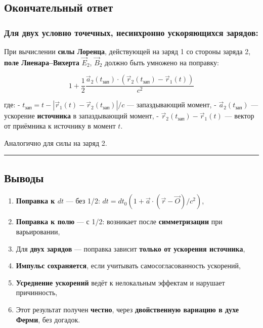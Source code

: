 \documentclass[11pt]{article}
\providecommand{\tightlist}{%
      \setlength{\itemsep}{0pt}\setlength{\parskip}{0pt}}
\begin{document}
\subsection{Окончательный ответ}

\subsubsection{Для двух условно точечных, несинхронно ускоряющихся зарядов:}

При вычислении \textbf{силы Лоренца}, действующей на заряд 1 со стороны
заряда 2, \textbf{поле Лиенара--Вихерта} \(\vec{E}_2\), \(\vec{B}_2\)
должно быть умножено на поправку:

\[
\boxed{
1 + \frac{1}{2} \frac{\vec{a}_2(t_{\text{зап}}) \cdot (\vec{r}_2(t_{\text{зап}}) - \vec{r}_1(t))}{c^2}
}
\]

где: -
\(t_{\text{зап}} = t - |\vec{r}_1(t) - \vec{r}_2(t_{\text{зап}})|/c\)
--- запаздывающий момент, - \(\vec{a}_2(t_{\text{зап}})\) --- ускорение
\textbf{источника} в запаздывающий момент, -
\(\vec{r}_2(t_{\text{зап}}) - \vec{r}_1(t)\) --- вектор от приёмника к
источнику в момент \(t\).

Аналогично для силы на заряд 2.

\begin{center}\rule{0.5\linewidth}{\linethickness}\end{center}

\subsection{ Выводы}

\begin{enumerate}
\def\labelenumi{\arabic{enumi}.}
\tightlist
\item
   \textbf{Поправка к \(dt\)} --- без 1/2:
  \(dt = dt_0 (1 + \vec{a} \cdot (\vec{r} - \vec{O})/c^2)\),
\item
   \textbf{Поправка к полю} --- с 1/2: возникает после
  \textbf{симметризации} при варьировании,
\item
   Для \textbf{двух зарядов} --- поправка зависит \textbf{только от
  ускорения источника},
\item
   \textbf{Импульс сохраняется}, если учитывать самосогласованность
  ускорений,
\item
   \textbf{Усреднение ускорений} ведёт к нелокальным эффектам и
  нарушает причинность,
\item
   Этот результат получен \textbf{честно}, через \textbf{двойственную
  вариацию в духе Ферми}, без догадок.
\end{enumerate}
\end{document}
